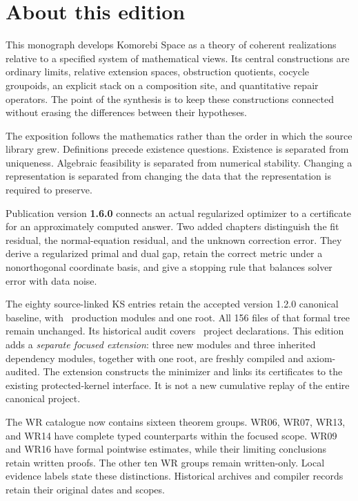 \documentclass[11pt]{article}
\begin{document}
\KomorebiCover
{}
\section*{About this edition}
This monograph develops Komorebi Space as a theory of coherent realizations relative to a specified system of mathematical views. Its central constructions are ordinary limits, relative extension spaces, obstruction quotients, cocycle groupoids, an explicit stack on a composition site, and quantitative repair operators. The point of the synthesis is to keep these constructions connected without erasing the differences between their hypotheses.

The exposition follows the mathematics rather than the order in which the source library grew. Definitions precede existence questions. Existence is separated from uniqueness. Algebraic feasibility is separated from numerical stability. Changing a representation is separated from changing the data that the representation is required to preserve.

Publication version \textbf{1.6.0} connects an actual regularized optimizer to a certificate for an approximately computed answer. Two added chapters distinguish the fit residual, the normal-equation residual, and the unknown correction error. They derive a regularized primal and dual gap, retain the correct metric under a nonorthogonal coordinate basis, and give a stopping rule that balances solver error with data noise.

The eighty source-linked KS entries retain the accepted version 1.2.0 canonical baseline, with \EditionFormalModules\ production modules and one root. All 156 files of that formal tree remain unchanged. Its historical audit covers \EditionAuditedDeclarations\ project declarations. This edition adds a \emph{separate focused extension}: three new modules and three inherited dependency modules, together with one root, are freshly compiled and axiom-audited. The extension constructs the minimizer and links its certificates to the existing protected-kernel interface. It is not a new cumulative replay of the entire canonical project.

The WR catalogue now contains sixteen theorem groups. WR06, WR07, WR13, and WR14 have complete typed counterparts within the focused scope. WR09 and WR16 have formal pointwise estimates, while their limiting conclusions retain written proofs. The other ten WR groups remain written-only. Local evidence labels state these distinctions. Historical archives and compiler records retain their original dates and scopes.
\end{document}
